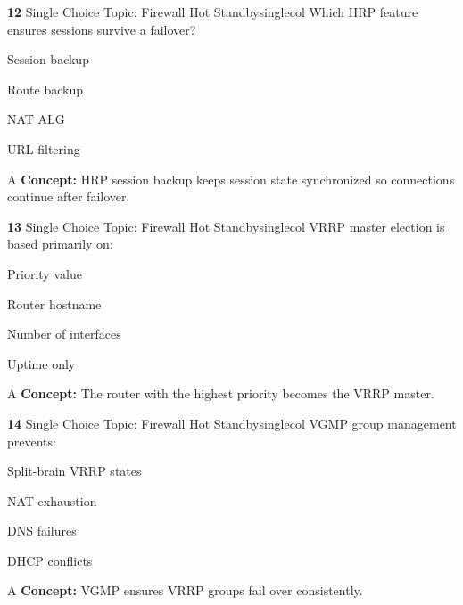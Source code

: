 \documentclass[10pt,a4paper]{article}
\begin{document}
\begin{qcard}{\color{white}\textbf{12} \hfill \small Single Choice \textbar{} Topic: Firewall Hot Standby}{singlecol}
Which HRP feature ensures sessions survive a failover?

\begin{qoptions}
\item Session backup
\item Route backup
\item NAT ALG
\item URL filtering
\end{qoptions}
\begin{explainbox}{A}
\textbf{Concept:} HRP session backup keeps session state synchronized so connections continue after failover.
\end{explainbox}
\end{qcard}

\begin{qcard}{\color{white}\textbf{13} \hfill \small Single Choice \textbar{} Topic: Firewall Hot Standby}{singlecol}
VRRP master election is based primarily on:

\begin{qoptions}
\item Priority value
\item Router hostname
\item Number of interfaces
\item Uptime only
\end{qoptions}
\begin{explainbox}{A}
\textbf{Concept:} The router with the highest priority becomes the VRRP master.
\end{explainbox}
\end{qcard}

\begin{qcard}{\color{white}\textbf{14} \hfill \small Single Choice \textbar{} Topic: Firewall Hot Standby}{singlecol}
VGMP group management prevents:

\begin{qoptions}
\item Split-brain VRRP states
\item NAT exhaustion
\item DNS failures
\item DHCP conflicts
\end{qoptions}
\begin{explainbox}{A}
\textbf{Concept:} VGMP ensures VRRP groups fail over consistently.
\end{explainbox}
\end{qcard}
\end{document}
